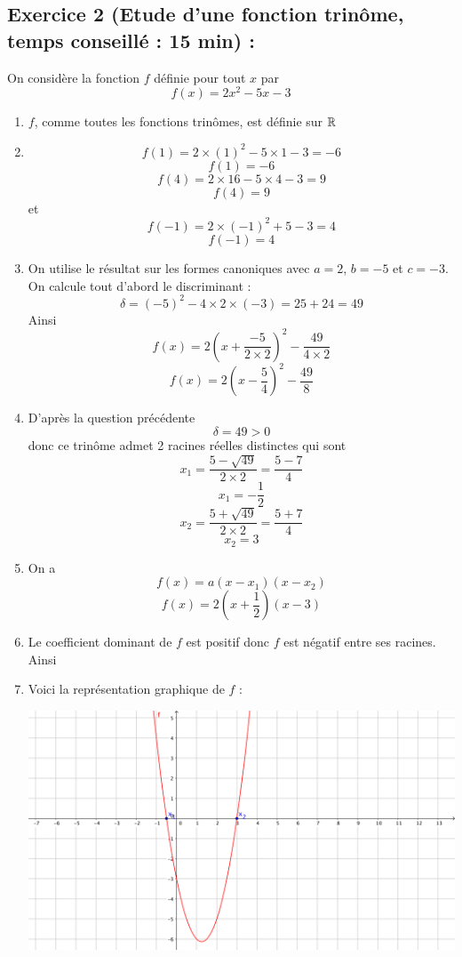 \subsection*{Exercice 2 (Etude d'une fonction trinôme, temps conseillé : 15 min) : }
On considère la fonction $f$ définie pour tout $x$ par $$f(x) = 2x^2-5x-3$$
\begin{enumerate}
\item $f$, comme toutes les fonctions trinômes, est définie sur $\mathbb{R}$
\item $$f(1) = 2\times(1)^2 - 5\times 1 - 3 = -6$$ 
$$\boxed{f(1) = -6}$$
$$f(4) = 2\times 16 -5\times4-3 = 9$$ $$\boxed{f(4) = 9}$$ et $$f(-1) = 2\times(-1)^2 + 5 -3 = 4$$
$$\boxed{f(-1) = 4}$$
\item On utilise le résultat sur les formes canoniques avec $a=2$, $b=-5$ et $c= -3$. On calcule tout d'abord le discriminant : 
$$\delta = (-5)^2 -4\times2\times(-3) = 25 + 24 = 49$$
Ainsi 
$$f(x) = 2\left(x+\frac{-5}{2\times2}\right)^2 -\frac{49}{4\times2}$$
$$\boxed{f(x) = 2\left(x-\frac{5}{4}\right)^2 - \frac{49}{8}}$$
\item D'après la question précédente $$\delta = 49 > 0$$ donc ce trinôme admet 2 racines réelles distinctes qui sont $$x_1 = \frac{5 - \sqrt{49}}{2\times 2} = \frac{5-7}{4}$$$$\boxed{x_1 = -\frac{1}{2}}$$ $$x_2 = \frac{5 + \sqrt{49}}{2\times 2} = \frac{5+7}{4}$$$$\boxed{x_2 = 3}$$
\item On a $$f(x) = a(x-x_1)(x-x_2)$$
$$\boxed{f(x) = 2\left(x+\frac{1}{2}\right)\left(x-3\right)}$$
\item Le coefficient dominant de $f$ est positif donc $f$ est négatif entre ses racines. Ainsi \newline

\item Voici la représentation graphique de $f$ : \newline

\center
\includegraphics[scale=0.7]{chap1_corr_ill1.png}
\flushleft
\end{enumerate}
